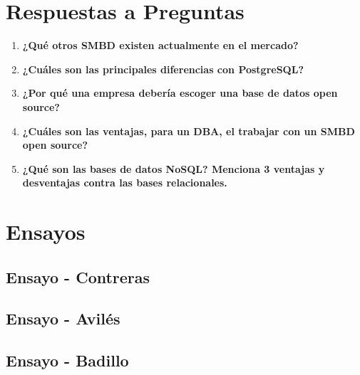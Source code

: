 \documentclass[11pt,letterpaper,spanish]{article}
\newcommand{\integranteUno}{Contreras}
\newcommand{\integranteDos}{Avilés}
\newcommand{\integranteTres}{Badillo}
\begin{document}
\section*{Respuestas a Preguntas}

\begin{enumerate}[label=\arabic*., leftmargin=*]
	\item \textbf{¿Qué otros SMBD existen actualmente en el mercado?} \\
	      

	\item \textbf{¿Cuáles son las principales diferencias con PostgreSQL?} \\
	      

	\item \textbf{¿Por qué una empresa debería escoger una base de datos open source?} \\
	      

	\item \textbf{¿Cuáles son las ventajas, para un DBA, el trabajar con un SMBD open source?} \\
	      

	\item \textbf{¿Qué son las bases de datos NoSQL? Menciona 3 ventajas y desventajas contra las bases relacionales.} \\
	      
\end{enumerate}

\section*{Ensayos}

\subsection*{Ensayo - \integranteUno}


\subsection*{Ensayo - \integranteDos}


\subsection*{Ensayo - \integranteTres}

\end{document}
